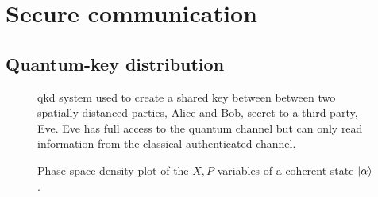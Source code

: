 \section{Secure communication}




\subsection{Quantum-key distribution}

\begin{figure}[htb]
	\centering
	
	\caption{\Gls{qkd} system used to create a shared key between between two spatially distanced parties, Alice and Bob, secret to a third party, Eve. Eve has full access to the quantum channel but can only read information from the classical authenticated channel.}
\end{figure}

\begin{figure}[htb]
	\centering
	
	\caption{Phase space density plot of the $X,P$ variables of a coherent state $\ket{\alpha}$.}
\end{figure}
